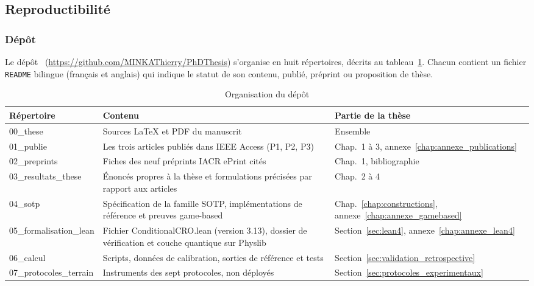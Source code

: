 \subsection{Reproductibilit\'e}
\label{sec:reproductibilite}
\begin{sloppypar}

\subsubsection{D\'ep\^ot}
\label{subsec:depot}

Le d\'ep\^ot~\cite{CROTrilemmaDepot} (\url{https://github.com/MINKAThierry/PhDThesis}) s'organise en huit r\'epertoires, d\'ecrits au
tableau~\ref{tab:depot_structure}. Chacun contient un fichier \texttt{README} bilingue
(fran\c{c}ais et anglais) qui indique le statut de son contenu, publi\'e, pr\'eprint ou
proposition de th\`ese.

\begin{table}[htbp]
\centering
\caption{Organisation du d\'ep\^ot}
\label{tab:depot_structure}
\small
\begin{tabularx}{\textwidth}{@{}l X l@{}}
\toprule
\textbf{R\'epertoire} & \textbf{Contenu} & \textbf{Partie de la th\`ese} \\
\midrule
00\_these & Sources \LaTeX{} et PDF du manuscrit & Ensemble \\
01\_publie & Les trois articles publi\'es dans IEEE Access (P1, P2, P3) & Chap.~1 \`a 3, annexe~\ref{chap:annexe_publications} \\
02\_preprints & Fiches des neuf pr\'eprints IACR ePrint cit\'es & Chap.~1, bibliographie \\
03\_resultats\_these & \'Enonc\'es propres \`a la th\`ese et formulations pr\'ecis\'ees par rapport aux articles & Chap.~2 \`a 4 \\
04\_sotp & Sp\'ecification de la famille SOTP, impl\'ementations de r\'ef\'erence et preuves game-based & Chap.~\ref{chap:constructions}, annexe~\ref{chap:annexe_gamebased} \\
05\_formalisation\_lean & Fichier ConditionalCRO.lean (version 3.13), dossier de v\'erification et couche quantique sur Physlib & Section~\ref{sec:lean4}, annexe~\ref{chap:annexe_lean4} \\
06\_calcul & Scripts, donn\'ees de calibration, sorties de r\'ef\'erence et tests & Section~\ref{sec:validation_retrospective} \\
07\_protocoles\_terrain & Instruments des sept protocoles, non d\'eploy\'es & Section~\ref{sec:protocoles_experimentaux} \\
\bottomrule
\end{tabularx}
\end{table}


\end{sloppypar}
